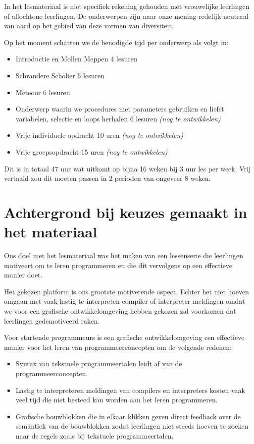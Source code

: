 \documentclass{BYUTextbook}
\begin{document}

In het lesmateriaal is niet specifiek rekening gehouden met vrouwelijke leerlingen of allochtone leerlingen. De onderwerpen zijn naar onze mening redelijk neutraal van aard op het gebied van deze vormen van diversiteit.

Op het moment schatten we de benodigde tijd per onderwerp als volgt in:
\begin{itemize}
  \item Introductie en Mollen Meppen 4 lesuren
  \item Schrandere Scholier 6 lesuren
  \item Meteoor 6 lesuren
  \item Onderwerp waarin we procedures met parameters gebruiken en liefst variabelen, selectie en loops herhalen 6 lesuren \emph{(nog te ontwikkelen)}
  \item Vrije individuele opdracht 10 uren \emph{(nog te ontwikkelen)}
  \item Vrije groepsopdracht 15 uren \emph{(nog te ontwikkelen)}
\end{itemize}

Dit is in totaal 47 uur wat uitkomt op bijna 16 weken bij 3 uur les per week. Vrij vertaald zou dit moeten passen in 2 perioden van ongeveer 8 weken.

\chapter{Achtergrond bij keuzes gemaakt in het materiaal}
Ons doel met het lesmateriaal was het maken van een lessenserie die leerlingen motiveert om te leren programmeren en die dit vervolgens op een effectieve manier doet.

Het gekozen platform is ons grootste motiverende aspect. Echter het niet hoeven omgaan met vaak lastig te interpreten compiler of interpreter meldingen omdat we voor een grafische ontwikkelomgeving hebben gekozen zal voorkomen dat leerlingen gedemotiveerd raken.

Voor startende programmeurs is een grafische ontwikkelomgeving een effectieve manier voor het leren van programmeerconcepten om de volgende redenen:
\begin{itemize}
  \item Syntax van tekstuele programmeertalen leidt af van de programmeerconcepten.
  \item Lastig te interpreteren meldingen van compilers en interpreters kosten vaak veel tijd die niet besteed kan worden aan het leren programmeren.
  \item Grafische bouwblokken die in elkaar klikken geven direct feedback over de semantiek van de bouwblokken zodat leerlingen niet steeds hoeven te zoeken naar de regels zoals bij tekstuele programmeertalen.
\end{itemize}
\end{document}
